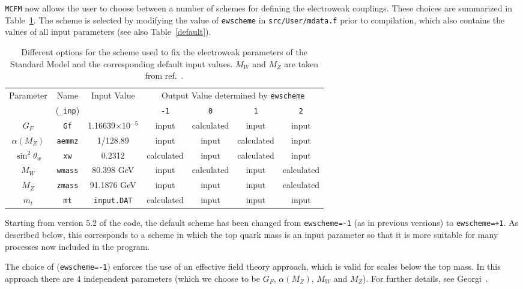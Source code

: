 \documentclass[12pt]{article}
\begin{document}
{\tt MCFM} now allows the user to choose between a number of schemes
for defining the electroweak couplings. These choices are summarized
in Table~\ref{ewscheme}. The scheme is selected by modifying the
value of {\tt ewscheme} in {\tt src/User/mdata.f} prior to compilation, 
which also contains
the values of all input parameters (see also Table~\ref{default}).

\begin{table}
\begin{center}
\begin{tabular}{|c|c|c|c|c|c|c|} \hline
 Parameter & Name & Input Value
 & \multicolumn{4}{c|}{Output Value determined by \tt ewscheme} \\
\cline{4-7}
& ({\tt \_inp}) & & {\tt -1} & {\tt 0} & {\tt 1} & {\tt 2} \\ \hline
$G_F$            & {\tt Gf}      & 1.16639$\times$10$^{-5}$ 
 & input & calculated & input & input \\
$\alpha(M_Z)$    & {\tt aemmz}   & 1/128.89                 
 & input & input & calculated & input \\
$\sin^2 \theta_w$& {\tt xw}      & 0.2312               
 & calculated & input & calculated & input \\
$M_W$            & {\tt wmass}   & 80.398 GeV                
 & input & calculated & input & calculated \\
$M_Z$            & {\tt zmass}   & 91.1876 GeV               
 & input & input & input & calculated \\
$m_t$            & {\tt mt}      & {\tt input.DAT}                  
 & calculated & input & input & input \\
\hline
\end{tabular}
\caption{Different options for the scheme used to fix the electroweak
parameters of the Standard Model and the corresponding default input
values. $M_W$ and $M_Z$ are taken from ref.~\cite{Amsler:2008zzb}.}
\label{ewscheme}
\end{center}
\end{table}

Starting from version 5.2 of the code, the default scheme has been
changed from {\tt ewscheme=-1} (as in previous versions) to
{\tt ewscheme=+1}. As described below, this corresponds to a scheme
in which the top quark mass is an input parameter so that it is
more suitable for many processes now included in the program.

The choice of ({\tt ewscheme=-1}) enforces the use of an effective field
theory approach, which is valid for scales below the top mass. In this
approach there are 4 independent parameters (which we choose to be
$G_F$, $\alpha(M_Z)$, $M_W$ and $M_Z$). For further details,
see Georgi~\cite{Georgi:1991ci}.
\end{document}
